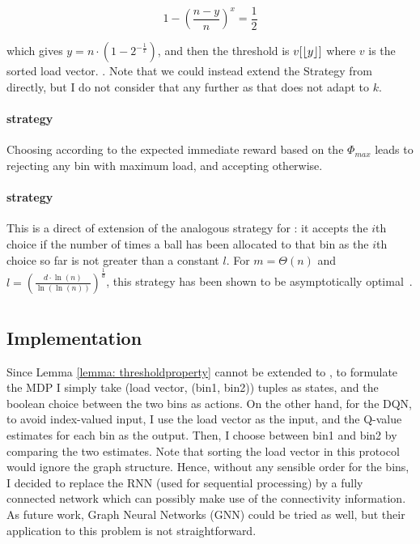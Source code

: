 \begin{equation} \label{quantilekthinning}
1 - (\frac{n-y}{n})^x = \frac{1}{2}
\end{equation}

which gives $y = n \cdot  (1 - 2^{-\frac{1}{x}})$, and then the threshold is $v[\lfloor y\rfloor]$ where $v$ is the sorted load vector. . Note that we could instead extend the \MeanThinning Strategy from \TwoThinning directly, but I do not consider that any further as that does not adapt to $k$.


\paragraph{\LocalRewardOptimiser strategy} Choosing according to the expected immediate reward based on the $\Phi_{max}$ leads to rejecting any bin with maximum load, and accepting otherwise.


\paragraph{\Threshold strategy} This is a direct of extension of the analogous strategy for \TwoThinning: it accepts the $i$th choice if the number of times a ball has been allocated to that bin as the $i$th choice so far is not greater than a constant $l$. For $m=\Theta(n)$ and $l=\left(\frac{d\cdot\ln(n)}{\ln(\ln(n))}\right)^{\frac{1}{d}}$, this strategy has been shown to be asymptotically optimal~\cite{feldheim2020dthinning}.


\section{\GraphicalTwoChoice}


\subsection{\DQL Implementation} \label{graphical-DQN}

Since Lemma \ref{lemma: thresholdproperty} cannot be extended to \GraphicalTwoChoice, to formulate the MDP I simply take (load vector, (bin1, bin2)) tuples as states, and the boolean choice between the two bins as actions. On the other hand, for the DQN, to avoid index-valued input, I use the load vector as the input, and the Q-value estimates for each bin as the output. Then, I choose between bin1 and bin2 by comparing the two estimates. Note that sorting the load vector in this protocol would ignore the graph structure. Hence, without any sensible order for the bins, I decided to replace the RNN (used for sequential processing) by a fully connected network which can possibly make use of the connectivity information. As future work, Graph Neural Networks (GNN) \cite{scarselli2009GNN} could be tried as well, but their application to this problem is not straightforward.



